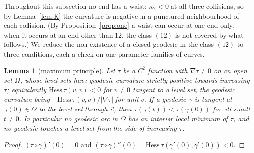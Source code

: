 \documentclass[11pt]{article}
\newtheorem{lemma}[theorem]{Lemma}
\theoremstyle{definition}
\begin{document}
Throughout this subsection no end has a waist: $\kappa_2<0$ at all three collisions, so by Lemma~\ref{lem:K} the
curvature is negative in a punctured neighbourhood of each collision. (By Proposition~\ref{prop:one} a waist can occur
at one end only; when it occurs at an end other than $12$, the class $(12)$ is not covered by what follows.) We reduce the
non-existence of a closed geodesic in the class $(12)$ to three conditions, each a check on one-parameter families of
curves.

\begin{lemma}[maximum principle]\label{lem:F}
Let $\tau$ be a $C^2$ function with $\nabla\tau\ne0$ on an open set $\Omega$, whose level sets have geodesic curvature
strictly positive towards increasing $\tau$; equivalently $\mathrm{Hess}\,\tau(v,v)<0$ for $v\ne0$ tangent to a level
set, the geodesic curvature being $-\mathrm{Hess}\,\tau(v,v)/|\nabla\tau|$ for unit $v$. If a
geodesic $\gamma$ is tangent at $\gamma(0)\in\Omega$ to the level set through it, then $\tau(\gamma(t))<\tau(\gamma(0))$
for all small $t\ne0$. In particular no geodesic arc in $\Omega$ has an interior local minimum of $\tau$, and no geodesic
touches a level set from the side of increasing $\tau$.
\end{lemma}

\begin{proof}
$(\tau\circ\gamma)'(0)=0$ and $(\tau\circ\gamma)''(0)=\mathrm{Hess}\,\tau(\gamma'(0),\gamma'(0))<0$.
\end{proof}
\end{document}

